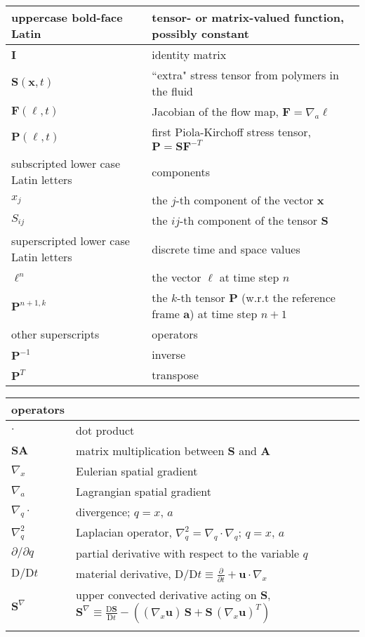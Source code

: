 \documentclass[12pt]{article}
\newcommand{\pd}[2]{\ensuremath{\frac{\partial #1}{\partial #2}}}
\newcommand{\bx}{{\mathbf x}}
\newcommand{\ba}{{\mathbf a}}
\newcommand{\bl}{{\pmb \ell}}
\newcommand{\bu}{{\mathbf u}}
\newcommand{\bS}{{\mathbf S}}
\newcommand{\bI}{{\mathbf I}}
\newcommand{\bA}{{\mathbf A}}
\newcommand{\bF}{{\mathbf F}}
\newcommand{\bP}{{\mathbf P}}
\begin{document}
\begin{center}
\begin{tabular}{|ll|}
		uppercase bold-face Latin &  tensor- or matrix-valued function, possibly constant \\
		\hline
		$\bI$ & identity matrix\\
		$\bS(\bx,t)$ & ``extra" stress tensor from polymers in the fluid \\
		$\bF(\bl,t)$ & Jacobian of the flow map, $\bF = \nabla_a \bl$ \\
		$\bP(\bl,t)$ & first Piola-Kirchoff stress tensor, $\bP = \bS\bF^{-T}$ \\
		\hline
		subscripted lower case Latin letters &  components \\
		\hline
		$x_j $ & the $ j$-th component of the vector $\bx$ \\
		$S_{ij}$ & the $ij$-th component of the tensor $\bS$ \\		
		\hline
		superscripted lower case Latin letters &  discrete time and space values \\
		\hline
		$\bl^{n} $ & the vector $\bl$ at time step $n$ \\
		$\bP^{n+1,k} $ & the $k$-th tensor $\bP$ (w.r.t the reference frame $\ba$) at time step $n+1$ \\
		\hline
		other superscripts &  operators \\
		\hline
		$\bP^{-1}$ & inverse \\
		$\bP^{T} $ & transpose \\
		\hline
	\end{tabular}
\begin{tabular}{|ll|}
	\hline
		operators & \\
		\hline
		$\cdot$ & dot product \\
		$\bS \bA$ & matrix multiplication between $\bS$ and $\bA$ \\
		$\nabla_x$ & Eulerian spatial gradient \\
		$\nabla_a$ & Lagrangian spatial gradient \\
		$\nabla_q \cdot$ & divergence; $q = x,\,a$ \\
		$\nabla_q^2$ & Laplacian operator, $\nabla_q^2 = \nabla_q \cdot \nabla_q$; $q = x,\,a$ \\
		$\partial/\partial q$ &  partial derivative with respect to the variable $q$ \\
		$\text{D}/\text{D}t$ &  material derivative, $\text{D}/\text{D}t \equiv \pd{}{t} + \bu \cdot \nabla_x$ \\
		$\bS^\nabla$ & upper convected derivative acting on $\bS$, $ \bS^\nabla \equiv \frac{\text{D} \bS}{\text{D}t} - \left((\nabla_x\bu)\,\bS + \bS\,(\nabla_x\bu)^T \right)$\\
		& \\
		\hline
	\end{tabular}
\end{center}
	
	
\end{document}
